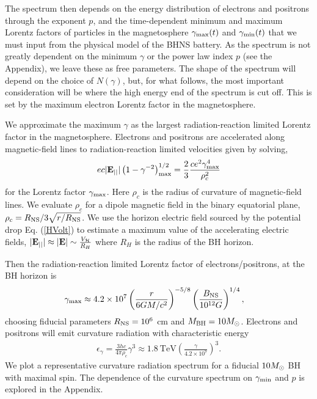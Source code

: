 The spectrum then depends on the energy distribution of electrons and
positrons through the exponent $p$, and the time-dependent minimum and
maximum Lorentz factors of particles in the magnetosphere $\gamma_{\rm
  max}(t)$ and $\gamma_{\rm min}(t)$ that we must input from the
physical model of the BHNS battery. As the spectrum is not greatly
dependent on the minimum $\gamma$ or the power law index $p$ (see the
Appendix), we leave these as free parameters. The shape of the
spectrum will depend on the choice of $N(\gamma)$, but, for what
follows, the most important consideration will be where the high
energy end of the spectrum is cut off. This is set by the maximum
electron Lorentz factor in the magnetosphere.

We approximate the maximum $\gamma$ as the largest radiation-reaction
limited Lorentz factor in the magnetosphere. Electrons and positrons
are accelerated along magnetic-field lines to radiation-reaction
limited velocities given by solving,
\begin{align}
 e c |{\bf E}_{||}| \left( 1 - \gamma^{-2}\right)^{1/2}_{\rm max}=
 \frac{2}{3} \frac{c e^2 \gamma^4_{\rm max}}{ \rho_c^2}
 \label{Eq:GamMax}
\end{align}
for the Lorentz factor $\gamma_{\rm max}$. Here $\rho_c$ is the radius
of curvature of magnetic-field lines. We evaluate $\rho_c$ for a
dipole magnetic field in the binary equatorial plane, $\rho_c = R_{\rm NS}/3
\sqrt{r/R_{\rm NS}}$.  We use the horizon electric field sourced by the
potential drop Eq. (\ref{HVolt}) to estimate a maximum value of the
accelerating electric fields, $ |{\bf E}_{||}| \approx |{\bf E}| \sim
\frac{V_{\mathcal{H}}}{ R_{H}} $ where $R_H$ is
the radius of the BH horizon.





Then the radiation-reaction limited Lorentz factor of
electrons/positrons, at the BH horizon is
\begin{align}
\gamma_{\rm max} &\approx 4.2 \times 10^7 \left(\frac{r}{6GM/c^2}
\right)^{-5/8} \left(\frac{B_{\rm NS}}{10^{12} G} \right)^{1/4},
\label{Eq:GamMax}
\end{align}
choosing fiducial parameters $R_{\rm NS} = 10^6$ cm and $M_{\rm BH}= 10
{{M_{\odot}}}$.  Electrons and positrons will emit curvature radiation with
characteristic energy
\begin{align}
\epsilon_{\gamma} = \frac{3hc}{4 \pi \rho_c} \gamma^3 \approx 1.8
\ \mbox{TeV} \left(\frac{\gamma}{4.2 \times 10^7}\right)^3.
\end{align}
We plot a representative curvature radiation spectrum for a fiducial
$10 {M_{\odot}}$ BH with maximal spin. The dependence of the curvature
spectrum on $\gamma_{\rm min}$ and $p$ is explored in the Appendix.




